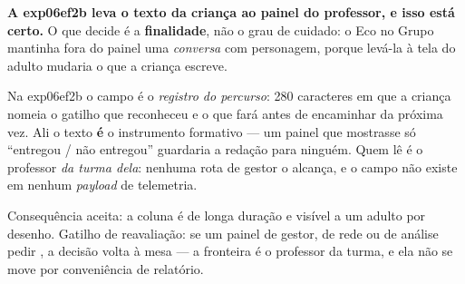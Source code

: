 \begin{decisao}
\textbf{A exp06ef2b leva o texto da criança ao painel do professor, e isso está
certo.} O que decide é a \textbf{finalidade}, não o grau de cuidado: o Eco no
Grupo mantinha fora do painel uma \emph{conversa} com personagem, porque
levá-la à tela do adulto mudaria o que a criança escreve.

Na exp06ef2b o campo é o \emph{registro do percurso}: 280 caracteres em que a
criança nomeia o gatilho que reconheceu e o que fará antes de encaminhar da
próxima vez. Ali o texto \textbf{é} o instrumento formativo --- um painel que
mostrasse só \enquote{entregou / não entregou} guardaria a redação para ninguém.
Quem lê é o professor \emph{da turma dela}: nenhuma rota de gestor o alcança, e
o campo não existe em nenhum \emph{payload} de telemetria.

Consequência aceita: a coluna é de longa duração e visível a um adulto por
desenho. Gatilho de reavaliação: se um
painel de gestor, de rede ou de análise pedir , a
decisão volta à mesa --- a fronteira é o professor da turma, e ela não se move
por conveniência de relatório.
\end{decisao}

